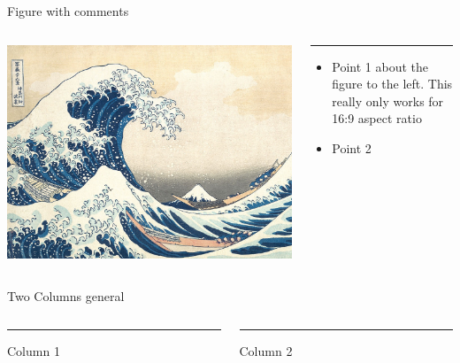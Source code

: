 \documentclass[aspectratio=43]{beamer}
\begin{document}
\begin{frame}{Figure with comments}
    \begin{columns}[T] %
    \begin{column}{.62\textwidth}
        \includegraphics[width= \linewidth]{img/kanagawa.jpg}
    \end{column}%

    \begin{column}{.38\textwidth}
        {\color{accent}\rule{\linewidth}{3pt}}
        
        \begin{itemize}[leftmargin=0cm]
            \item Point 1 about the figure to the left. This really only works for 16:9 aspect ratio
            \item Point 2
        \end{itemize}
    \end{column}%
    \end{columns}
\end{frame}


\begin{frame}{Two Columns general}
    \begin{columns}[T] %
    \begin{column}{.50\textwidth}
        {\color{accent}\rule{\linewidth}{3pt}}
        Column 1
    \end{column}
    
    \hfill
    
    \begin{column}{.50\textwidth}
        {\color{accent}\rule{\linewidth}{3pt}}
        Column 2
    \end{column}
    \end{columns}
\end{frame}
\end{document}
